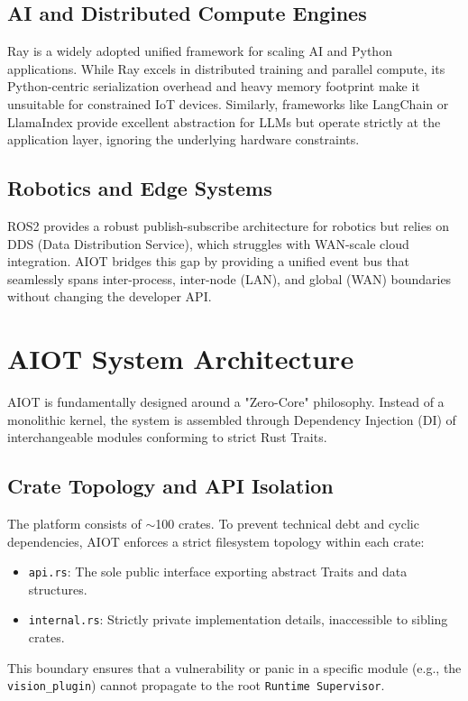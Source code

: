 \documentclass[conference,compsoc]{IEEEtran}
\begin{document}
\subsection{AI and Distributed Compute Engines}
Ray is a widely adopted unified framework for scaling AI and Python applications. While Ray excels in distributed training and parallel compute, its Python-centric serialization overhead and heavy memory footprint make it unsuitable for constrained IoT devices. Similarly, frameworks like LangChain or LlamaIndex provide excellent abstraction for LLMs but operate strictly at the application layer, ignoring the underlying hardware constraints.

\subsection{Robotics and Edge Systems}
ROS2 provides a robust publish-subscribe architecture for robotics but relies on DDS (Data Distribution Service), which struggles with WAN-scale cloud integration. AIOT bridges this gap by providing a unified event bus that seamlessly spans inter-process, inter-node (LAN), and global (WAN) boundaries without changing the developer API.

\section{AIOT System Architecture}
AIOT is fundamentally designed around a "Zero-Core" philosophy. Instead of a monolithic kernel, the system is assembled through Dependency Injection (DI) of interchangeable modules conforming to strict Rust Traits.

\subsection{Crate Topology and API Isolation}
The platform consists of $\sim$100 crates. To prevent technical debt and cyclic dependencies, AIOT enforces a strict filesystem topology within each crate:
\begin{itemize}
    \item \texttt{api.rs}: The sole public interface exporting abstract Traits and data structures.
    \item \texttt{internal.rs}: Strictly private implementation details, inaccessible to sibling crates.
\end{itemize}
This boundary ensures that a vulnerability or panic in a specific module (e.g., the \texttt{vision\_plugin}) cannot propagate to the root \texttt{Runtime Supervisor}.
\end{document}
